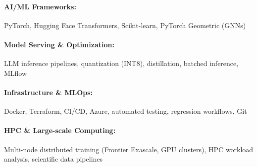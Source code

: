 \documentclass[10pt, letterpaper]{article}
\newenvironment{highlights}{
    \begin{itemize}[
        topsep=0.10 cm,
        parsep=0.10 cm,
        partopsep=0pt,
        itemsep=0pt,
        leftmargin=0 cm + 10pt
    ]
}{
    \end{itemize}
} %
\newenvironment{onecolentry}{
    \begin{adjustwidth}{
        0 cm + 0.00001 cm
    }{
        0 cm + 0.00001 cm
    }
}{
    \end{adjustwidth}
} %
\begin{document}
        \paragraph{AI/ML Frameworks:} PyTorch, Hugging Face Transformers, Scikit-learn, PyTorch Geometric (GNNs)
        \vspace{-4mm}
        \paragraph{Model Serving \& Optimization:} LLM inference pipelines, quantization (INT8), distillation, batched inference, MLflow
        \vspace{-4mm}
        \paragraph{Infrastructure \& MLOps:} Docker, Terraform, CI/CD, Azure, automated testing, regression workflows, Git
        \vspace{-4mm}
        \paragraph{HPC \& Large-scale Computing:} Multi-node distributed training (Frontier Exascale, GPU clusters), HPC workload analysis, scientific data pipelines

    
        

\end{document}
